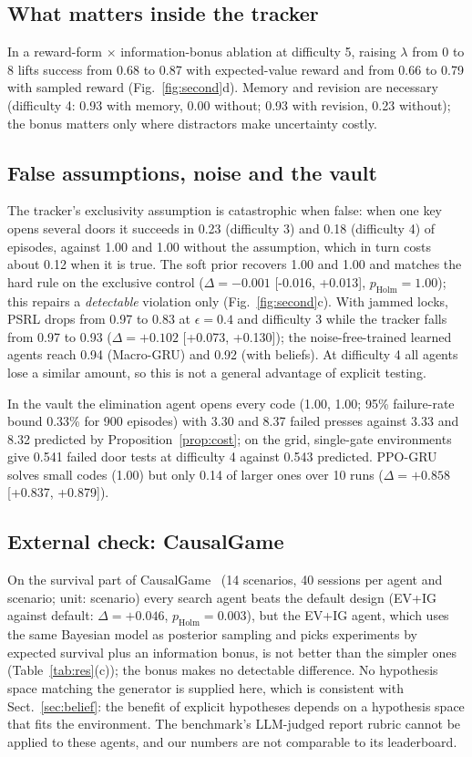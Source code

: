 \documentclass[conference]{IEEEtran}
\begin{document}
\subsection{What matters inside the tracker}
In a reward-form $\times$ information-bonus ablation at difficulty 5, raising $\lambda$ from 0 to 8 lifts success from 0.68 to 0.87 with expected-value reward and from 0.66 to 0.79 with sampled reward (Fig.~\ref{fig:second}d). Memory and revision are necessary (difficulty 4: 0.93 with memory, 0.00 without; 0.93 with revision, 0.23 without); the bonus matters only where distractors make uncertainty costly.

\subsection{False assumptions, noise and the vault}
The tracker's exclusivity assumption is catastrophic when false: when one key opens several doors it succeeds in 0.23 (difficulty 3) and 0.18 (difficulty 4) of episodes, against 1.00 and 1.00 without the assumption, which in turn costs about 0.12 when it is true. The soft prior recovers 1.00 and 1.00 and matches the hard rule on the exclusive control ($\Delta=-0.001$ [-0.016, +0.013], $p_{\mathrm{Holm}}=1.00$); this repairs a \emph{detectable} violation only (Fig.~\ref{fig:second}c). With jammed locks, PSRL drops from 0.97 to 0.83 at $\epsilon=0.4$ and difficulty 3 while the tracker falls from 0.97 to 0.93 ($\Delta=+0.102$ [+0.073, +0.130]); the noise-free-trained learned agents reach 0.94 (Macro-GRU) and 0.92 (with beliefs). At difficulty 4 all agents lose a similar amount, so this is not a general advantage of explicit testing.

In the vault the elimination agent opens every code (1.00, 1.00; 95\% failure-rate bound 0.33\% for 900 episodes) with 3.30 and 8.37 failed presses against 3.33 and 8.32 predicted by Proposition~\ref{prop:cost}; on the grid, single-gate environments give 0.541 failed door tests at difficulty 4 against 0.543 predicted. PPO-GRU solves small codes (1.00) but only 0.14 of larger ones over 10 runs ($\Delta=+0.858$ [+0.837, +0.879]).


\subsection{External check: CausalGame}
On the survival part of CausalGame~\cite{chen2026causalgame} (14 scenarios, 40 sessions per agent and scenario; unit: scenario) every search agent beats the default design (EV+IG against default: $\Delta=+0.046$, $p_{\mathrm{Holm}}=0.003$), but the EV+IG agent, which uses the same Bayesian model as posterior sampling and picks experiments by expected survival plus an information bonus, is not better than the simpler ones (Table~\ref{tab:res}(c)); the bonus makes no detectable difference. No hypothesis space matching the generator is supplied here, which is consistent with Sect.~\ref{sec:belief}: the benefit of explicit hypotheses depends on a hypothesis space that fits the environment. The benchmark's LLM-judged report rubric cannot be applied to these agents, and our numbers are not comparable to its leaderboard.
\end{document}
